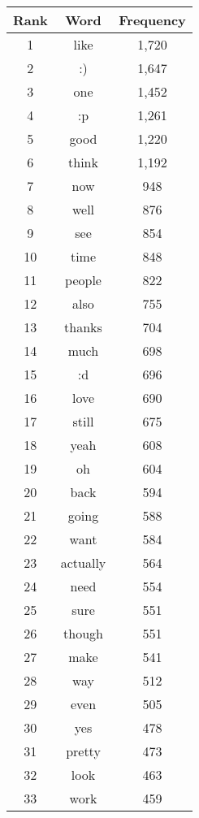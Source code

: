 \clearpage
\begin{table}[!htbp]
\begin{minipage}[b]{.5\textwidth}
	\centering
	\begin{tabular}{|c|c|c|} %
		\hline
		\textbf{Rank} & \textbf{Word} & \textbf{Frequency}  \\ \hline
		1 & like & 1,720 \\ \hline
		2 & :) & 1,647 \\ \hline
		3 & one & 1,452 \\ \hline
		4 & :p & 1,261 \\ \hline
		5 & good & 1,220 \\ \hline
		6 & think & 1,192 \\ \hline
		7 & now & 948 \\ \hline
		8 & well & 876 \\ \hline
		9 & see & 854 \\ \hline
		10 & time & 848 \\ \hline
		11 & people & 822 \\ \hline
		12 & also & 755 \\ \hline
		13 & thanks & 704 \\ \hline
		14 & much & 698 \\ \hline
		15 & :d & 696 \\ \hline
		16 & love & 690 \\ \hline 
		17 & still & 675 \\ \hline
		18 & yeah & 608 \\ \hline
		19 & oh & 604 \\ \hline
		20 & back & 594 \\ \hline
		21 & going & 588 \\ \hline
		22 & want & 584 \\ \hline
		23 & actually & 564 \\ \hline
		24 & need & 554 \\ \hline
		25 & sure & 551 \\ \hline
		26 & though & 551 \\ \hline
		27 & make & 541 \\ \hline
		28 & way & 512 \\ \hline
		29 & even & 505 \\ \hline
		30 & yes & 478 \\ \hline
		31 & pretty & 473 \\ \hline
		32 & look & 463 \\ \hline
		33 & work & 459 \\ \hline

\end{tabular}
\end{minipage}
\end{table}

